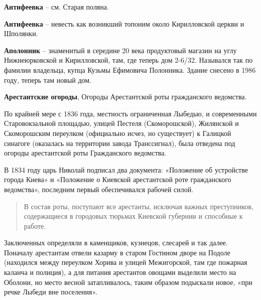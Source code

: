 \medskip


\textbf{Антифеевка} – см. Старая поляна.\\

\medskip


\textbf{Антифеевка} – невесть как возникший топоним около Кирилловской церкви и Шполянки.\\

\medskip



\textbf{Аполонник} – знаменитый в середине 20 века продуктовый магазин на углу Нижнеюрковской и Кирилловской, там, где теперь дом 2-6/32. Назывался так по фамилии владельца, купца Кузьмы Ефимовича Полонника. Здание снесено в 1986 году, теперь там новый дом.\\

\medskip


\textbf{Арестантские огороды}, Огороды Арестантской роты гражданского ведомства.

По крайней мере с 1836 года, местность ограниченная Лыбедью, и современными Старовокзальной площадью, улицей Пестеля (Скоморошской), Жилянской и Скоморошским переулком (официально исчез, но существует) к Галицкой синагоге (оказалась на территории завода Транссигнал), была отведена под огороды арестантской роты Гражданского ведомства.

В 1834 году царь Николай подписал два документа: «Положение об устройстве города Киева» и «Положение о Киевской арестантской роте гражданского ведомства», последним первый обеспечивался рабочей силой.

\begin{quotation}
В состав роты, поступают все арестанты, исключая важных преступников, содержащиеся в городовых тюрьмах Киевской губернии и способные к работе.
\end{quotation}

Заключенных определяли в каменщиков, кузнецов, слесарей и так далее. Поначалу арестантам отвели казарму в старом Гостином дворе на Подоле (находился между переулком Хорива и улицей Межигорской, там где пожарная каланча и полиция), а для питания арестантов овощами выделили место на Оболони, но место весной затапливалось, таким образом подыскали новое, «при речке Лыбеди вне поселения».

